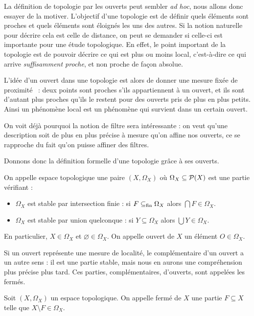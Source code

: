La définition de topologie par les ouverts peut sembler \textit{ad hoc}, nous
allons donc essayer de la motiver. L'objectif d'une topologie est de définir
quels éléments sont proches et quels éléments sont éloignés les uns des autres.
Si la notion naturelle pour décrire cela est celle de distance, on peut se
demander si celle-ci est importante pour une étude topologique. En effet, le
point important de la topologie est de pouvoir décrire ce qui est plus ou moins
local, c'est-à-dire ce qui arrive \textit{suffisamment proche}, et non proche de
façon absolue.

L'idée d'un ouvert dans une topologie est alors de donner une mesure fixée de
proximité~ : deux points sont proches s'ils appartiennent à un ouvert, et ils
sont d'autant plus proches qu'ils le restent pour des ouverts pris de plus en
plus petits. Ainsi un phénomène local est un phénomène qui survient dans un
certain ouvert.

On voit déjà pourquoi la notion de filtre sera intéressante : on veut qu'une
description soit de plus en plus précise à mesure qu'on affine nos ouverts,
ce se rapproche du fait qu'on puisse affiner des filtres.

Donnons donc la définition formelle d'une topologie grâce à ses ouverts.

\begin{definition}
  On appelle espace topologique une paire $(X,\Omega_X)$ où
  $\Omega_X\subseteq\mathcal{P}(X)$ est une partie vérifiant :
  \begin{itemize}
  \item $\Omega_X$ est stable par intersection finie : si $F\subseteq_{\mathrm{fin}} \Omega_X$
    alors $\bigcap F \in \Omega_X$.
  \item $\Omega_X$ est stable par union quelconque : si $Y\subseteq \Omega_X$
    alors $\bigcup Y \in \Omega_X$.
  \end{itemize}

  En particulier, $X\in \Omega_X$ et $\varnothing\in \Omega_X$. On appelle
  ouvert de $X$ un élément $O\in\Omega_X$.
\end{definition}

Si un ouvert représente une mesure de localité, le complémentaire d'un ouvert a
un autre sens : il est une partie stable, mais nous en aurons une compréhension
plus précise plus tard. Ces parties, complémentaires, d'ouverts, sont appelées
les fermés.

\begin{definition}[Fermé]
  Soit $(X,\Omega_X)$ un espace topologique. On appelle fermé de $X$ une partie
  $F\subseteq X$ telle que $X\setminus F \in \Omega_X$.
\end{definition}

